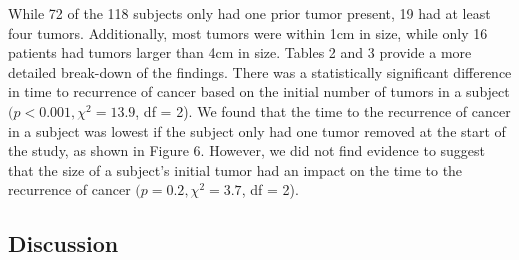 \documentclass{article}
\begin{document}
	While 72 of the 118 subjects only had one prior tumor present, 19 had at least four tumors. Additionally, most tumors were within 1cm in size, while only 16 patients had tumors larger than 4cm in size. Tables 2 and 3 provide a more detailed break-down of the findings. There was a statistically significant difference in time to recurrence of cancer based on the initial number of tumors in a subject $(p < 0.001, \chi^2 = 13.9$, df = 2). We found that the time to the recurrence of cancer in a subject was lowest if the subject only had one tumor removed at the start of the study, as shown in Figure 6. However, we did not find evidence to suggest that the size of a subject’s initial tumor had an impact on the time to the recurrence of cancer $(p = 0.2, \chi^2 = 3.7$, df = 2).


	\subsection*{Discussion}
		
\end{document}
